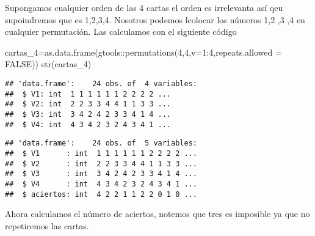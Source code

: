 \documentclass[
]{article}
\newenvironment{Shaded}{\begin{snugshade}}{\end{snugshade}}
\newcommand{\AttributeTok}[1]{\textcolor[rgb]{0.77,0.63,0.00}{#1}}
\newcommand{\ConstantTok}[1]{\textcolor[rgb]{0.00,0.00,0.00}{#1}}
\newcommand{\ControlFlowTok}[1]{\textcolor[rgb]{0.13,0.29,0.53}{\textbf{#1}}}
\newcommand{\DecValTok}[1]{\textcolor[rgb]{0.00,0.00,0.81}{#1}}
\newcommand{\FunctionTok}[1]{\textcolor[rgb]{0.00,0.00,0.00}{#1}}
\newcommand{\NormalTok}[1]{#1}
\newcommand{\OtherTok}[1]{\textcolor[rgb]{0.56,0.35,0.01}{#1}}
\newcommand{\SpecialCharTok}[1]{\textcolor[rgb]{0.00,0.00,0.00}{#1}}
\begin{document}
Supongamos cualquier orden de las 4 cartas el orden es irrelevanta así
qeu supoindremos que es 1,2,3,4. Nosotros podemos lcolocar los números
1,2 ,3 ,4 en cualquier permutación. Las calculamos con el siguiente
código

\begin{Shaded}
\begin{Highlighting}[]
\NormalTok{cartas\_4}\OtherTok{=}\FunctionTok{as.data.frame}\NormalTok{(gtools}\SpecialCharTok{::}\FunctionTok{permutations}\NormalTok{(}\DecValTok{4}\NormalTok{,}\DecValTok{4}\NormalTok{,}\AttributeTok{v=}\DecValTok{1}\SpecialCharTok{:}\DecValTok{4}\NormalTok{,}\AttributeTok{repeats.allowed =} \ConstantTok{FALSE}\NormalTok{))}
\FunctionTok{str}\NormalTok{(cartas\_4)}
\end{Highlighting}
\end{Shaded}

\begin{verbatim}
## 'data.frame':    24 obs. of  4 variables:
##  $ V1: int  1 1 1 1 1 1 2 2 2 2 ...
##  $ V2: int  2 2 3 3 4 4 1 1 3 3 ...
##  $ V3: int  3 4 2 4 2 3 3 4 1 4 ...
##  $ V4: int  4 3 4 2 3 2 4 3 4 1 ...
\end{verbatim}

\begin{Shaded}
\end{Shaded}

\begin{verbatim}
## 'data.frame':    24 obs. of  5 variables:
##  $ V1      : int  1 1 1 1 1 1 2 2 2 2 ...
##  $ V2      : int  2 2 3 3 4 4 1 1 3 3 ...
##  $ V3      : int  3 4 2 4 2 3 3 4 1 4 ...
##  $ V4      : int  4 3 4 2 3 2 4 3 4 1 ...
##  $ aciertos: int  4 2 2 1 1 2 2 0 1 0 ...
\end{verbatim}

Ahora calculamos el número de aciertos, notemos que tres es imposible ya
que no repetiremos las cartas.

\begin{Shaded}
\end{Shaded}
\end{document}
